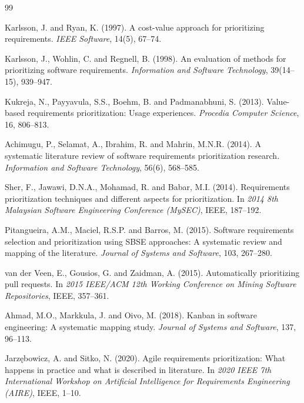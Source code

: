 \documentclass[12pt,a4paper,oneside]{report}
\begin{document}
\begin{thebibliography}{99}

Karlsson, J. and Ryan, K. (1997). A cost-value approach for prioritizing requirements. \textit{IEEE Software}, 14(5), 67--74.

Karlsson, J., Wohlin, C. and Regnell, B. (1998). An evaluation of methods for prioritizing software requirements. \textit{Information and Software Technology}, 39(14--15), 939--947.

Kukreja, N., Payyavula, S.S., Boehm, B. and Padmanabhuni, S. (2013). Value-based requirements prioritization: Usage experiences. \textit{Procedia Computer Science}, 16, 806--813.

Achimugu, P., Selamat, A., Ibrahim, R. and Mahrin, M.N.R. (2014). A systematic literature review of software requirements prioritization research. \textit{Information and Software Technology}, 56(6), 568--585.

Sher, F., Jawawi, D.N.A., Mohamad, R. and Babar, M.I. (2014). Requirements prioritization techniques and different aspects for prioritization. In \textit{2014 8th Malaysian Software Engineering Conference (MySEC)}, IEEE, 187--192.

Pitangueira, A.M., Maciel, R.S.P. and Barros, M. (2015). Software requirements selection and prioritization using SBSE approaches: A systematic review and mapping of the literature. \textit{Journal of Systems and Software}, 103, 267--280.

van der Veen, E., Gousios, G. and Zaidman, A. (2015). Automatically prioritizing pull requests. In \textit{2015 IEEE/ACM 12th Working Conference on Mining Software Repositories}, IEEE, 357--361.

Ahmad, M.O., Markkula, J. and Oivo, M. (2018). Kanban in software engineering: A systematic mapping study. \textit{Journal of Systems and Software}, 137, 96--113.

Jarz\k{e}bowicz, A. and Sitko, N. (2020). Agile requirements prioritization: What happens in practice and what is described in literature. In \textit{2020 IEEE 7th International Workshop on Artificial Intelligence for Requirements Engineering (AIRE)}, IEEE, 1--10.


\end{thebibliography}
\end{document}
